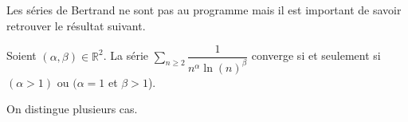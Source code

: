 \documentclass[french,11pt,twoside]{VcCours}
\newcommand{\Sum}[2]{\ensuremath{\textstyle{\sum\limits_{#1}^{#2}}}}
\begin{document}
Les séries de Bertrand ne sont pas au programme mais il est important de savoir retrouver le résultat suivant.

\begin{prop} 
Soient $(\alpha, \beta) \in \mathbb{R}^2$. La série $\Sum{n \geq 2}{} \dfrac{1}{n^{\alpha} \ln(n)^{\beta}}$ converge si et seulement si $(\alpha > 1)$ ou $(\alpha = 1$ et $\beta >1$).
\end{prop}

\begin{preuve} On distingue plusieurs cas.

\vspace{10.5cm}

\end{preuve}
\end{document}
